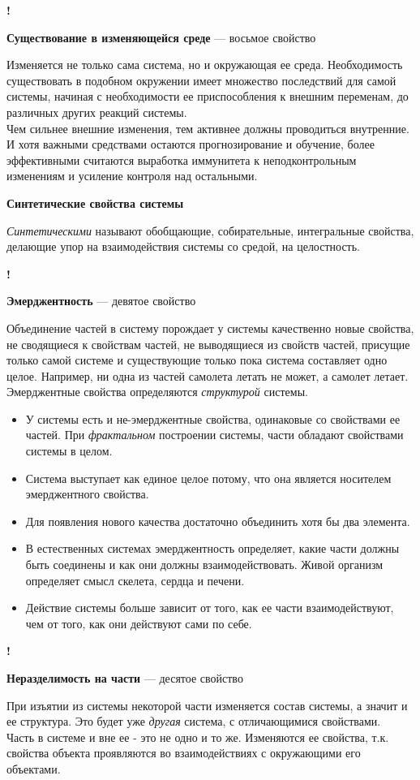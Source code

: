 \documentclass{article}
\newcommand{\note}[1]{\textit{#1}}
\renewcommand{\subsection}[1]{
	\vspace{2em}
	\begin{flushright}
		\large
		\textbf{#1}
	\end{flushright}
	}
\newcommand{\define}[2]{
	\textbf{#1} --- #2
	}
\newcommand{\marked}[2]{
	\begin{flushright}\textbf{!}\hspace{2ex}\vline\hspace{2ex}
		\begin{minipage}{0.9\textwidth}
			\define{#1}{#2}
		\end{minipage}
	\end{flushright}
	}
\begin{document}
\marked{Существование в изменяющейся среде}{восьмое свойство}
Изменяется не только сама система, но и окружающая ее среда. Необходимость существовать в подобном окружении имеет множество последствий для самой системы, начиная с необходимости ее приспособления к внешним переменам, до различных других реакций системы.\\
Чем сильнее внешние изменения, тем активнее должны проводиться внутренние. И хотя важными средствами остаются прогнозирование и обучение, более эффективными считаются выработка иммунитета к неподконтрольным изменениям и усиление контроля над остальными.
\subsection{Синтетические свойства системы}
\note{Синтетическими} называют обобщающие, собирательные, интегральные свойства, делающие упор на взаимодействия системы со средой, на целостность.
\marked{Эмерджентность}{девятое свойство}
Объединение частей в систему порождает у системы качественно новые свойства, не сводящиеся к свойствам частей, не выводящиеся из свойств частей, присущие только самой системе и существующие только пока система составляет одно целое. Например, ни одна из частей самолета летать не может, а самолет летает. Эмерджентные свойства определяются \note{структурой} системы.
\begin{itemize}
	\item У системы есть и не-эмерджентные свойства, одинаковые со свойствами ее частей. При \note{фрактальном} построении системы, части обладают свойствами системы в целом.
	\item Система выступает как единое целое потому, что она является носителем эмерджентного свойства.
	\item Для появления нового качества достаточно объединить хотя бы два элемента.
	\item В естественных системах эмерджентность определяет, какие части должны быть соединены и как они должны взаимодействовать. Живой организм определяет смысл скелета, сердца и печени.
	\item Действие системы больше зависит от того, как ее части взаимодействуют, чем от того, как они действуют сами по себе.
\end{itemize}
\marked{Неразделимость на части}{десятое свойство}
При изъятии из системы некоторой части изменяется состав системы, а значит и ее структура. Это будет уже \note{другая} система, с отличающимися свойствами.\\
Часть в системе и вне ее - это не одно и то же. Изменяются ее свойства, т.к. свойства объекта проявляются во взаимодействиях с окружающими его объектами.
\end{document}
